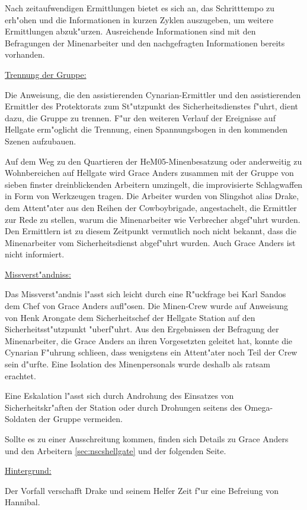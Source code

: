\begin{remarks}
	Nach zeitaufwendigen Ermittlungen bietet es sich an, das Schritttempo zu erh"ohen und die Informationen in kurzen Zyklen auszugeben, um weitere Ermittlungen abzuk"urzen. Ausreichende Informationen sind mit den Befragungen der Minenarbeiter und den nachgefragten Informationen bereits vorhanden.

	\underline{Trennung der Gruppe:}

	Die Anweisung, die den assistierenden Cynarian-Ermittler und den assistierenden Ermittler des Protektorats zum St"utzpunkt des Sicherheitsdienstes f"uhrt, dient dazu, die Gruppe zu trennen. F"ur den weiteren Verlauf der Ereignisse auf Hellgate erm"oglicht die Trennung, einen Spannungsbogen in den kommenden Szenen aufzubauen.
\end{remarks}

                              
Auf dem Weg zu den Quartieren der HeM05-Minenbesatzung oder anderweitig zu Wohnbereichen auf Hellgate wird Grace Anders zusammen mit der Gruppe von sieben finster dreinblickenden Arbeitern umzingelt, die improvisierte Schlagwaffen in Form von Werkzeugen tragen. Die Arbeiter wurden von Slingshot alias Drake, dem Attent"ater aus den Reihen der Cowboybrigade, angestachelt, die Ermittler zur Rede zu stellen, warum die Minenarbeiter wie Verbrecher abgef"uhrt wurden. Den Ermittlern ist zu diesem Zeitpunkt vermutlich noch nicht bekannt, dass die Minenarbeiter vom Sicherheitsdienst abgef"uhrt wurden. Auch Grace Anders ist nicht informiert.
\vfill\pagebreak

\begin{remarks}
	\underline{Missverst"andniss:}

	Das Missverst"andnis l"asst sich leicht durch eine R"uckfrage bei Karl Sandos dem Chef von Grace Anders aufl"osen. Die Minen-Crew wurde auf Anweisung von Henk Arongate dem Sicherheitschef der Hellgate Station auf den Sicherheitsst"utzpunkt "uberf"uhrt. Aus den Ergebnissen der Befragung der Minenarbeiter, die Grace Anders an ihren Vorgesetzten geleitet hat, konnte die Cynarian F"uhrung schlie\3en, dass wenigstens ein Attent"ater noch Teil der Crew sein d"urfte. Eine Isolation des Minenpersonals wurde deshalb als ratsam erachtet.

	Eine Eskalation l"asst sich durch Androhung des Einsatzes von Sicherheitskr"aften der Station oder durch Drohungen seitens des Omega-Soldaten der Gruppe vermeiden. 

	Sollte es zu einer Ausschreitung kommen, finden sich Details zu Grace Anders und den Arbeitern \cref{sec:nscshellgate} und der folgenden Seite.

	\underline{Hintergrund:}

	Der Vorfall verschafft Drake und seinem Helfer Zeit f"ur eine Befreiung von Hannibal.
\end{remarks}

